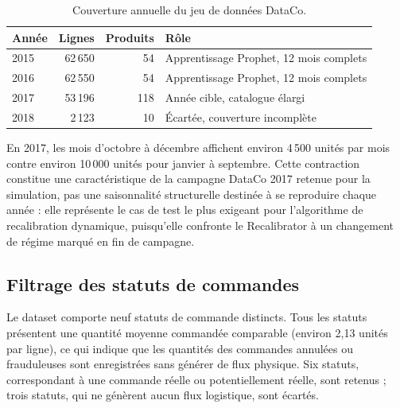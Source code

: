 \documentclass[11pt,a4paper]{article}
\begin{document}
\begin{table}[htbp]
\centering
\caption{Couverture annuelle du jeu de données DataCo.}
\label{tab:dataco-couverture}
\begin{tabular}{lrrl}
\toprule
Année & Lignes & Produits & Rôle \\
\midrule
2015 & 62\,650 & 54 & Apprentissage Prophet, 12 mois complets \\
2016 & 62\,550 & 54 & Apprentissage Prophet, 12 mois complets \\
2017 & 53\,196 & 118 & Année cible, catalogue élargi \\
2018 & 2\,123 & 10 & Écartée, couverture incomplète \\
\bottomrule
\end{tabular}
\end{table}

En 2017, les mois d'octobre à décembre affichent environ 4\,500 unités par mois contre environ 10\,000 unités pour janvier à septembre. Cette contraction constitue une caractéristique de la campagne DataCo 2017 retenue pour la simulation, pas une saisonnalité structurelle destinée à se reproduire chaque année : elle représente le cas de test le plus exigeant pour l'algorithme de recalibration dynamique, puisqu'elle confronte le Recalibrator à un changement de régime marqué en fin de campagne.

\subsection{Filtrage des statuts de commandes}

Le dataset comporte neuf statuts de commande distincts. Tous les statuts présentent une quantité moyenne commandée comparable (environ 2,13 unités par ligne), ce qui indique que les quantités des commandes annulées ou frauduleuses sont enregistrées sans générer de flux physique. Six statuts, correspondant à une commande réelle ou potentiellement réelle, sont retenus ; trois statuts, qui ne génèrent aucun flux logistique, sont écartés.
\end{document}
